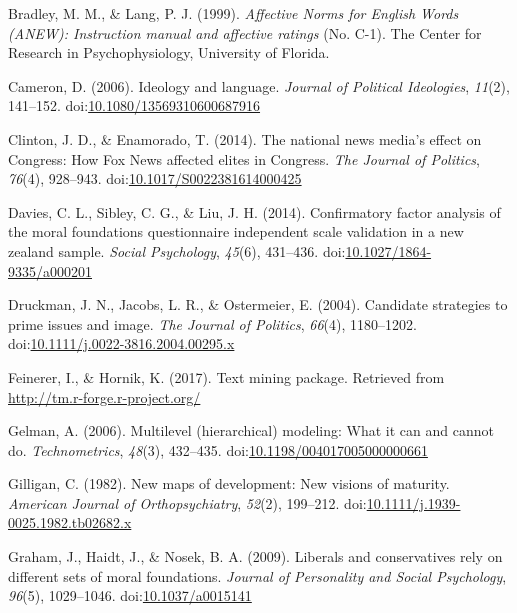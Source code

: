 \documentclass[english,,man]{apa6}
\begin{document}
\leavevmode\hypertarget{ref-Bradley1999}{}%
Bradley, M. M., \& Lang, P. J. (1999). \emph{Affective Norms for English Words (ANEW): Instruction manual and affective ratings} (No. C-1). The Center for Research in Psychophysiology, University of Florida.

\leavevmode\hypertarget{ref-Cameron2006}{}%
Cameron, D. (2006). Ideology and language. \emph{Journal of Political Ideologies}, \emph{11}(2), 141--152. doi:\href{https://doi.org/10.1080/13569310600687916}{10.1080/13569310600687916}

\leavevmode\hypertarget{ref-Clinton2014}{}%
Clinton, J. D., \& Enamorado, T. (2014). The national news media's effect on Congress: How Fox News affected elites in Congress. \emph{The Journal of Politics}, \emph{76}(4), 928--943. doi:\href{https://doi.org/10.1017/S0022381614000425}{10.1017/S0022381614000425}

\leavevmode\hypertarget{ref-Davies2014}{}%
Davies, C. L., Sibley, C. G., \& Liu, J. H. (2014). Confirmatory factor analysis of the moral foundations questionnaire independent scale validation in a new zealand sample. \emph{Social Psychology}, \emph{45}(6), 431--436. doi:\href{https://doi.org/10.1027/1864-9335/a000201}{10.1027/1864-9335/a000201}

\leavevmode\hypertarget{ref-Druckman2004}{}%
Druckman, J. N., Jacobs, L. R., \& Ostermeier, E. (2004). Candidate strategies to prime issues and image. \emph{The Journal of Politics}, \emph{66}(4), 1180--1202. doi:\href{https://doi.org/10.1111/j.0022-3816.2004.00295.x}{10.1111/j.0022-3816.2004.00295.x}

\leavevmode\hypertarget{ref-Feinerer2017}{}%
Feinerer, I., \& Hornik, K. (2017). Text mining package. Retrieved from \url{http://tm.r-forge.r-project.org/}

\leavevmode\hypertarget{ref-Gelman2006}{}%
Gelman, A. (2006). Multilevel (hierarchical) modeling: What it can and cannot do. \emph{Technometrics}, \emph{48}(3), 432--435. doi:\href{https://doi.org/10.1198/004017005000000661}{10.1198/004017005000000661}

\leavevmode\hypertarget{ref-Gilligan1982}{}%
Gilligan, C. (1982). New maps of development: New visions of maturity. \emph{American Journal of Orthopsychiatry}, \emph{52}(2), 199--212. doi:\href{https://doi.org/10.1111/j.1939-0025.1982.tb02682.x}{10.1111/j.1939-0025.1982.tb02682.x}

\leavevmode\hypertarget{ref-Graham2009}{}%
Graham, J., Haidt, J., \& Nosek, B. A. (2009). Liberals and conservatives rely on different sets of moral foundations. \emph{Journal of Personality and Social Psychology}, \emph{96}(5), 1029--1046. doi:\href{https://doi.org/10.1037/a0015141}{10.1037/a0015141}
\end{document}
